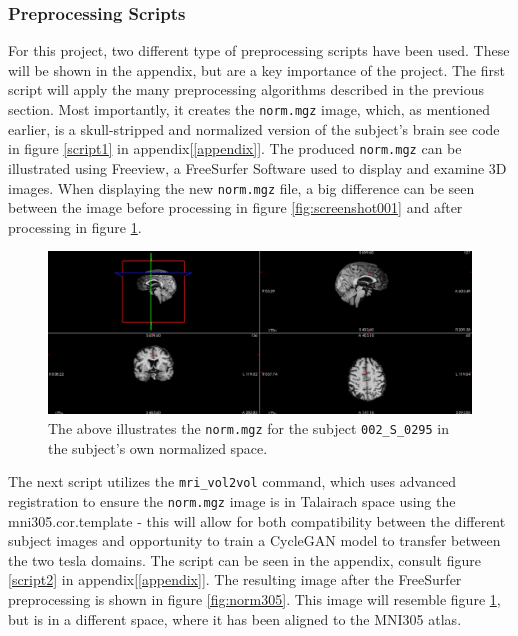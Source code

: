 \documentclass[11pt, fleqn, titlepage]{article}
\newcommand{\1}[1]{\mathds{1}\left[#1\right]}
\begin{document}
\subsubsection{Preprocessing Scripts}\label{preprocess_scripts}
For this project, two different type of preprocessing scripts have been used. These will be shown in the appendix, but are a key importance of the project. The first script will apply the many preprocessing algorithms described in the previous section. Most importantly, it creates the \texttt{norm.mgz} image, which, as mentioned earlier, is a skull-stripped and normalized version of the subject's brain see code in figure \ref{script1} in appendix[\ref{appendix}].
The produced \texttt{norm.mgz} can be illustrated using Freeview, a FreeSurfer Software used to display and examine 3D images. 
When displaying the new \texttt{norm.mgz} file, a big difference can be seen between the image before processing in figure \ref{fig:screenshot001} and after processing in figure \ref{fig:norm}.

\begin{figure}[H]
	\centering
	\includegraphics[width=0.9\linewidth]{imgs/norm}
	\caption{The above illustrates the \texttt{norm.mgz} for the subject \texttt{002\_S\_0295} in the subject's own normalized space.} 
	\label{fig:norm}
\end{figure}

The next script utilizes the \texttt{mri\_vol2vol} command, which uses advanced registration to ensure the \texttt{norm.mgz} image is in Talairach space using the mni305.cor.template - this will allow for both compatibility between the different subject images and opportunity to train a CycleGAN model to transfer between the two tesla domains. The script can be seen in the appendix, consult figure \ref{script2} in appendix[\ref{appendix}].
\noindent
The resulting image after the FreeSurfer preprocessing is shown in figure \ref{fig:norm305}. This image will resemble figure \ref{fig:norm}, but is in a different space, where it has been aligned to the MNI305 atlas. 
\end{document}
